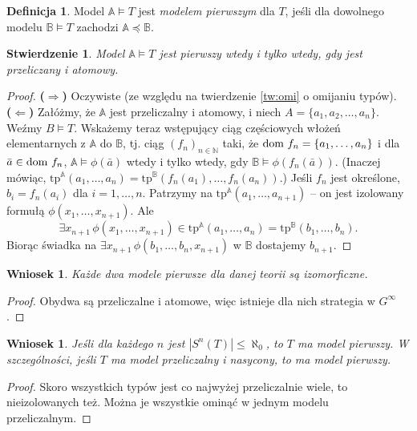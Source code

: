 \documentclass{article}
\newcommand{\N}{\mathbb{N}}
\newcommand{\A}{\mathbb{A}}
\newcommand{\B}{\mathbb{B}}
\newcommand{\dom}{\textnormal{dom }}
\theoremstyle{plain}
\newtheorem{stw}[thm]{Stwierdzenie}
\newtheorem{wn}[thm]{Wniosek}
\theoremstyle{definition}
\newtheorem{df}[thm]{Definicja}
\theoremstyle{remark}
\begin{document}
\begin{df}
	Model $\A \models T$ jest \textit{modelem pierwszym} dla $T$,
	jeśli dla dowolnego modelu $\B \models T$ zachodzi $\A \preccurlyeq \B$.
\end{df}
\begin{stw}
	Model $\A \models T$ jest pierwszy wtedy i tylko wtedy, gdy jest
	przeliczany i atomowy.
\end{stw}
\begin{proof}
	\textbf{($\Rightarrow$)} Oczywiste
	(ze względu na twierdzenie \ref{tw:omi} o omijaniu typów).
	\\\textbf{($\Leftarrow$)}
	Załóżmy, że $\A$ jest przeliczalny i atomowy, i niech $A = \{a_1, a_2,
	\ldots, a_n\}$. Weźmy $B \models T$. Wskażemy teraz wstępujący ciąg
	częściowych włożeń elementarnych z $\A$ do $\B$, tj. ciąg $(f_n)_{n \in
	\N}$ taki, że
	$\dom f_n = \{a_1, \ldots, a_n\}$ i dla $\bar{a} \in \dom f_n$,
	$\A \models \phi(\bar{a})$ wtedy i tylko wtedy, gdy
	$\B \models \phi(f_n(\bar{a}))$. (Inaczej mówiąc,
	$\text{tp}^\A(a_1, \ldots, a_n) =
	\text{tp}^\B(f_n(a_1), \ldots, f_n(a_n))$.)
	Jeśli $f_n$ jest określone, $b_i = f_n(a_i)$ dla $i = 1, \ldots, n$.
	Patrzymy na $\text{tp}^\A(a_1, \ldots, a_{n+1})$ -- on jest izolowany
	formułą $\phi(x_1, \ldots, x_{n+1})$. Ale
	$$
	\exists x_{n+1} \, \phi(x_1, \ldots, x_{n+1}) \in
	\text{tp}^\A(a_1, \ldots, a_n) =
	\text{tp}^\B(b_1, \ldots, b_n).
	$$
	Biorąc świadka na
	$\exists x_{n+1} \, \phi(b_1, \ldots, b_n, x_{n+1})$
	w $\B$ dostajemy $b_{n+1}$.
\end{proof}

\begin{wn}
	 Każde dwa modele pierwsze dla danej teorii są izomorficzne.
\end{wn}

\begin{proof}
	Obydwa są przeliczalne i atomowe, więc istnieje dla nich strategia w
	$G^{\infty}$.
\end{proof}

\begin{wn}
	Jeśli dla każdego $n$ jest $|S^n(T)| \leq \aleph_0$, to $T$ ma model
	pierwszy. W szczególności, jeśli $T$ ma model przeliczalny i nasycony,
	to ma model pierwszy.
\end{wn}
\begin{proof}
	Skoro wszystkich typów jest co najwyżej przeliczalnie wiele, to
	nieizolowanych też.
	Można je wszystkie ominąć w jednym modelu przeliczalnym.
\end{proof}
\end{document}
